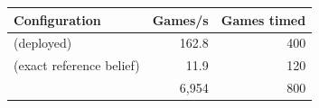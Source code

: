 \begin{tabular}{lrr}
\toprule
Configuration & Games/s & Games timed \\
\midrule
\vfast{} (deployed) & 162.8 & 400 \\
\vblock{} (exact reference belief) & 11.9 & 120 \\
\vthree{} & 6{,}954 & 800 \\
\bottomrule
\end{tabular}